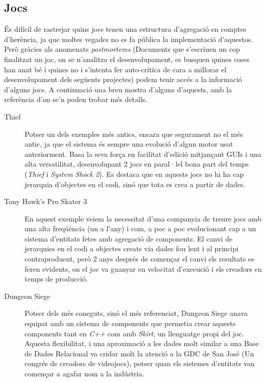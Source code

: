 \subsection{Jocs}

És difícil de rastrejar quins jocs tenen una estructura d'agregació en comptes d'herència, ja que moltes vegades no es fa pública la implementació d'aquestos. Però gràcies als anomenats {\em postmortems} (Documents que s'escriuen un cop finalitzat un joc, on se n'analitza el desenvolupament, es busquen quines coses han anat bé i quines no i s'intenta fer auto-crítica de cara a millorar el desenvolupament dels següents projectes) podem tenir accés a la informació d'alguns jocs. A continuació una breu mostra d'alguns d'aquests, amb la referència d'on se'n poden trobar més detalls.

\begin{description}
  \item[Thief] \citep{Leonard99} Potser un dels exemples més antics, encara que segurament no el més antic, ja que el sistema és sempre una evolució d'algun motor usat anteriorment. Basa la seva força en facilitat d'edició mitjançant GUIs i una alta versatilitat, desenvolupant 2 jocs en paral·lel bona part del temps ({\em Thief} i {\em System Shock 2}). Es destaca que en aquests jocs no hi ha cap jerarquia d'objectes en el codi, sinó que tota es crea a partir de dades.
    
  \item[Tony Hawk's Pro Skater 3] \citep{West07} En aquest exemple veiem la necessitat d'una companyia de treure jocs amb una alta freqüència (un a l'any) i com, a poc a poc evolucionant cap a un sistema d'entitats fetes amb agregació de components. El canvi de jerarquies en el codi a objectes creats via dades fou lent i al principi contraproduent, però 2 anys després de començar el canvi els resultats es feren evidents, on el joc va guanyar en velocitat d'execució i els creadors en temps de producció.
    
  \item[Dungeon Siege] \citep{Bilas02} Potser dels més coneguts, sinó el més referenciat, Dungeon Siege anava equipat amb un sistema de components que permetia crear aquests components tant en {\em C++} com amb {\em Skirt}, un llenguatge propi del joc. Aquesta flexibilitat, i una aproximació a les dades molt similar a una Base de Dades Relacional va cridar molt la atenció a la GDC de San José (Un congrés de creadors de videojocs), potser quan els sistemes d'entitats van començar a agafar nom a la indústria.
    
\end{description}


